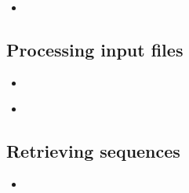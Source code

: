 \documentclass[compress, ucs, xelatex, 11pt, xcolor=x11names, aspectratio=1609,
	hyperref={
		bookmarks=true,
		unicode=true,
		colorlinks=true,
		pdftitle={HybSeq course},
		plainpages=false,
		pdfauthor={Vojtech Zeisek},
		pdfsubject={Practical processing of HybSeq target enrichment sequencing data on computing grids like MetaCentrum},
		pdfcreator={XeLaTeX},
		pdfkeywords={BASH, command line, GNU, HybSeq, Linux, MetaCentrum, sequencing shell, target enrichment},
		linkcolor=Cyan2, %
		anchorcolor=Firebrick2, %
		citecolor=Firebrick2, %
		filecolor=Firebrick2, %
		menucolor=Firebrick2, %
		urlcolor=Chartreuse2, %
		pdftex},
	url={hyphens, lowtilde} %
	]{beamer}
\begin{document}
\begin{frame}[fragile]{}
	\begin{itemize}
		\item 
	\end{itemize}
	\begin{spluscode}
    
	\end{spluscode}
	\begin{bashcode}
    
	\end{bashcode}
\end{frame}

\subsection{Processing input files}

\begin{frame}[fragile]{}
	\begin{itemize}
		\item 
	\end{itemize}
	\begin{spluscode}
    
	\end{spluscode}
	\begin{bashcode}
    
	\end{bashcode}
\end{frame}

\begin{frame}[fragile]{}
	\begin{itemize}
		\item 
	\end{itemize}
	\begin{spluscode}
    
	\end{spluscode}
	\begin{bashcode}
    
	\end{bashcode}
\end{frame}

\subsection{Retrieving sequences}

\begin{frame}[fragile]{}
	\begin{itemize}
		\item 
	\end{itemize}
	\begin{spluscode}
    
	\end{spluscode}
	\begin{bashcode}
    
	\end{bashcode}
\end{frame}
\end{document}
